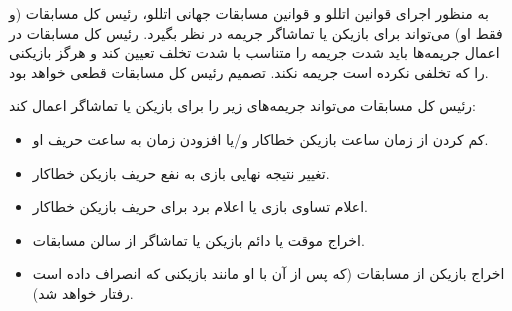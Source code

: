 


به منظور اجرای قوانین اتللو و قوانین مسابقات جهانی اتللو، رئیس کل مسابقات (و فقط او) می‌تواند برای بازیکن یا تماشاگر جریمه در نظر بگیرد. رئیس کل مسابقات در اعمال جریمه‌ها باید شدت جریمه را متناسب با شدت تخلف تعیین کند و هرگز بازیکنی را که تخلفی نکرده است جریمه نکند. تصمیم رئیس کل مسابقات قطعی خواهد بود.


رئیس کل مسابقات می‌تواند جریمه‌های زیر را برای بازیکن یا تماشاگر اعمال کند:

\begin{itemize}
  \item کم کردن از زمان ساعت بازیکن خطاکار و/یا افزودن زمان به ساعت حریف او.
  \item تغییر نتیجه نهایی بازی به نفع حریف بازیکن خطاکار.
  \item اعلام تساوی بازی یا اعلام برد برای حریف بازیکن خطاکار.
  \item اخراج موقت یا دائم بازیکن یا تماشاگر از سالن مسابقات.
  \item اخراج بازیکن از مسابقات (که پس از آن با او مانند بازیکنی که انصراف داده است رفتار خواهد شد).
\end{itemize}
